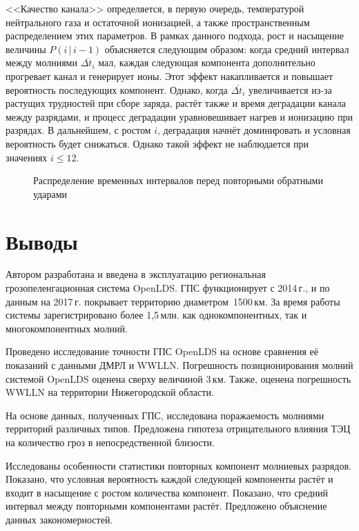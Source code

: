 <<Качество канала>> определяется, в первую очередь, температурой нейтрального газа и остаточной ионизацией, а также пространственным распределением этих параметров. В рамках данного подхода, рост и насыщение величины $P(i\,|\,i-1)$ объясняется следующим образом: когда средний интервал между молниями $\overline {\Delta t_i}$ мал, каждая следующая компонента дополнительно прогревает канал и генерирует ионы. Этот эффект накапливается и повышает вероятность последующих компонент. Однако, когда $\overline {\Delta t_i}$ увеличивается из-за растущих трудностей при сборе заряда, растёт также и время деградации канала между разрядами, и процесс деградации уравновешивает нагрев и ионизацию при разрядах. В дальнейшем, с ростом $i$, деградация начнёт доминировать и условная вероятность будет снижаться. Однако такой эффект не наблюдается при значениях $i \le 12$.

\begin{figure}[h]
	\caption{Распределение временных интервалов перед повторными обратными ударами}
	\label{fig:lds-hist}
\end{figure}

\section{Выводы}
Автором разработана и введена в эксплуатацию региональная грозопеленгационная система OpenLDS. ГПС функционирует с 2014\,г., и по данным на 2017\,г. покрывает территорию диаметром~1500\,км. За время работы системы зарегистрировано более 1,5\,млн. как однокомпонентных, так и многокомпонентных молний.

Проведено исследование точности ГПС OpenLDS на основе сравнения её показаний с данными ДМРЛ и WWLLN. Погрешность позиционирования молний системой OpenLDS оценена сверху величиной 3\,км. Также, оценена погрешность WWLLN на территории Нижегородской области.

На основе данных, полученных ГПС, исследована поражаемость молниями территорий различных типов. Предложена гипотеза отрицательного влияния ТЭЦ на количество гроз в непосредственной близости. 

Исследованы особенности статистики повторных компонент молниевых разрядов. Показано, что условная вероятность каждой следующей компоненты растёт и входит в насыщение с ростом количества компонент. Показано, что средний интервал между повторными компонентами растёт. Предложено объяснение данных закономерностей.



\FloatBarrier
